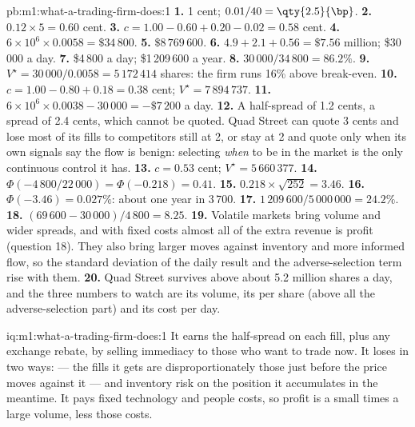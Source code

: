 \begin{solution}{pb:m1:what-a-trading-firm-does:1}
\textbf{1.} 1 cent; $0.01/40 = \qty{2.5}{\bp}$.
\textbf{2.} $0.12 \times 5 = 0.60$ cent.
\textbf{3.} $c = 1.00 - 0.60 + 0.20 - 0.02 = 0.58$ cent.
\textbf{4.} $6 \times 10^6 \times 0.0058 = \$34\,800$.
\textbf{5.} $\$8\,769\,600$.
\textbf{6.} $4.9 + 2.1 + 0.56 = \$7.56$ million; \$30\,000 a day.
\textbf{7.} \$4\,800 a day; \$1\,209\,600 a year.
\textbf{8.} $30\,000/34\,800 = 86.2\%$.
\textbf{9.} $V^\star = 30\,000/0.0058 = 5\,172\,414$ shares: the firm runs 16\%
above break-even.
\textbf{10.} $c = 1.00 - 0.80 + 0.18 = 0.38$ cent; $V^\star = 7\,894\,737$.
\textbf{11.} $6 \times 10^6 \times 0.0038 - 30\,000 = -\$7\,200$ a day.
\textbf{12.} A half-spread of 1.2 cents, a spread of 2.4 cents, which cannot
be quoted. Quad Street can quote 3 cents and lose most of its fills to
competitors still at 2, or stay at 2 and quote only when its own signals say
the flow is benign: selecting \emph{when} to be in the market is the only
continuous control it has.
\textbf{13.} $c = 0.53$ cent; $V^\star = 5\,660\,377$.
\textbf{14.} $\Phi(-4\,800/22\,000) = \Phi(-0.218) = 0.41$.
\textbf{15.} $0.218 \times \sqrt{252} = 3.46$.
\textbf{16.} $\Phi(-3.46) = 0.027\%$: about one year in 3\,700.
\textbf{17.} $1\,209\,600/5\,000\,000 = 24.2\%$.
\textbf{18.} $(69\,600 - 30\,000)/4\,800 = 8.25$.
\textbf{19.} Volatile markets bring volume and wider spreads, and with fixed
costs almost all of the extra revenue is profit (question 18). They also
bring larger moves against inventory and more informed flow, so the standard
deviation of the daily result and the adverse-selection term rise with them.
\textbf{20.} Quad Street survives above about 5.2 million shares a day, and
the three numbers to watch are its volume, its  per share
(above all the adverse-selection part) and its cost per day.
\end{solution}

\begin{solution}{iq:m1:what-a-trading-firm-does:1}
It earns the half-spread on each fill, plus any exchange rebate, by selling
immediacy to those who want to trade now. It loses in two ways:  --- the fills it gets are disproportionately those just before the
price moves against it --- and inventory risk on the position it accumulates
in the meantime. It pays fixed technology and people costs, so profit is a
small  times a large volume, less those costs.
\end{solution}


